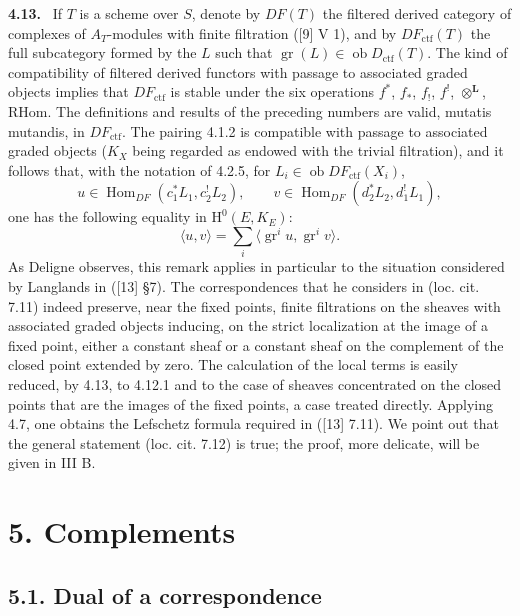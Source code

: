 \documentclass[11pt]{article}
\newenvironment{statement}[1]{\par\medskip\noindent\textbf{#1.}\ }{\par\medskip}
\renewcommand{\H}{\mathrm{H}}
\DeclareMathOperator{\Hom}{Hom}
\newcommand{\ob}{\operatorname{ob}}
\providecommand{\RHom}{\mathrm{RHom}}
\providecommand{\Dctf}{D_{\mathrm{ctf}}}
\providecommand{\ctf}{\mathrm{ctf}}
\providecommand{\gr}{\operatorname{gr}}
\providecommand{\Dctf}{D_{\mathrm{ctf}}}
\providecommand{\RHom}{\mathrm{RHom}}
\providecommand{\Hom}{\operatorname{Hom}}
\providecommand{\ob}{\operatorname{ob}}
\providecommand{\gr}{\operatorname{gr}}
\providecommand{\gr}{\operatorname{gr}}
\providecommand{\RHom}{\mathrm R\mathcal{H}om}
\providecommand{\RHom}{\mathrm{RHom}}
\begin{document}
\begin{statement}{4.13}
If $T$ is a scheme over $S$, denote by $DF(T)$ the filtered derived category of complexes of $A_T$-modules with finite filtration ([9] V 1), and by $DF_{\ctf}(T)$ the full subcategory formed by the $L$ such that $\gr(L)\in\ob\Dctf(T)$. The kind of compatibility of filtered derived functors with passage to associated graded objects implies that $DF_{\ctf}$ is stable under the six operations $f^*$, $f_*$, $f_!$, $f^!$, $\otimes^{\mathbf L}$, $\RHom$. The definitions and results of the preceding numbers are valid, mutatis mutandis, in $DF_{\ctf}$. The pairing 4.1.2 is compatible with passage to associated graded objects ($K_X$ being regarded as endowed with the trivial filtration), and it follows that, with the notation of 4.2.5, for $L_i\in\ob DF_{\ctf}(X_i)$,
\[
u\in\Hom_{DF}(c_1^*L_1,c_2^!L_2),\qquad
v\in\Hom_{DF}(d_2^*L_2,d_1^!L_1),
\]
one has the following equality in $\H^0(E,K_E)$:
\begin{equation}
\tag{4.13.1}
\langle u,v\rangle=\sum_i\langle \gr^i u,\gr^i v\rangle.
\end{equation}
As Deligne observes, this remark applies in particular to the situation considered by Langlands in ([13] §7). The correspondences that he considers in (loc. cit. 7.11) indeed preserve, near the fixed points, finite filtrations on the sheaves with associated graded objects inducing, on the strict localization at the image of a fixed point, either a constant sheaf or a constant sheaf on the complement of the closed point extended by zero. The calculation of the local terms is easily reduced, by 4.13, to 4.12.1 and to the case of sheaves concentrated on the closed points that are the images of the fixed points, a case treated directly. Applying 4.7, one obtains the Lefschetz formula required in ([13] 7.11). We point out that the general statement (loc. cit. 7.12) is true; the proof, more delicate, will be given in III B.
\end{statement}



\section*{5. Complements}

\subsection*{5.1. Dual of a correspondence}
\end{document}
